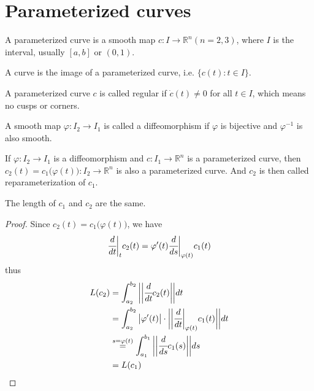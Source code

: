 \documentclass[10pt]{article}
\begin{document}
        \section{Parameterized curves}
            \begin{definition}
                A parameterized curve is a smooth map $c: I\rightarrow\mathbb{R}^n(n = 2, 3)$, where $I$ is the interval, usually $[a,b]$ or $(0,1)$.
            \end{definition}
            \begin{definition}[Curve]
                A curve is the image of a parameterized curve, i.e. $\{c(t): t\in I\}$.
            \end{definition}
            \begin{definition}
                A parameterized curve $c$ is called regular if $\dot{c}(t)\neq 0$ for all $t\in I$, which means no cusps or corners.
            \end{definition}
            \begin{definition}[Diffeomorphism]
                A smooth map $\varphi: I_2\rightarrow I_1$ is called a diffeomorphism if $\varphi$ is bijective and $\varphi^{-1}$ is also smooth.
            \end{definition}
            \begin{definition}[Reparameterization]
                If $\varphi: I_2\rightarrow I_1$ is a diffeomorphism and $c:I_1\rightarrow\mathbb{R}^n$ is a parameterized curve, then $c_2(t) = c_1\big(\varphi(t)\big): I_2\rightarrow\mathbb{R}^n$ is also a parameterized curve. And $c_2$ is then called reparameterization of $c_1$.
            \end{definition}
            \begin{lemma}
                The length of $c_1$ and $c_2$ are the same.
            \end{lemma}
            \begin{proof}
                Since $c_2(t) = c_1\big(\varphi(t)\big)$, we have
                \begin{equation*}
                    \begin{aligned}
                        \cfrac{d}{dt}\bigg|_tc_2(t) = \varphi'(t)\cfrac{d}{ds}\bigg|_{\varphi(t)}c_1(t)
                    \end{aligned}
                \end{equation*}
                thus
                \begin{equation*}
                    \begin{aligned}
                        L(c_2) &= \int_{a_2}^{b_2}\bigg|\bigg|\cfrac{d}{dt}c_2(t)\bigg|\bigg|dt \\
                        &= \int_{a_2}^{b_2}\big|\varphi'(t)\big|\cdot\bigg|\bigg|\cfrac{d}{dt}\bigg|_{\varphi(t)}c_1(t)\bigg|\bigg|dt \\
                        &\stackrel{s=\varphi(t)}{=}\int_{a_1}^{b_1}\bigg|\bigg|\cfrac{d}{ds}c_1(s)\bigg|\bigg|ds \\
                        &= L(c_1)
                    \end{aligned}
                \end{equation*}
            \end{proof}
\end{document}
